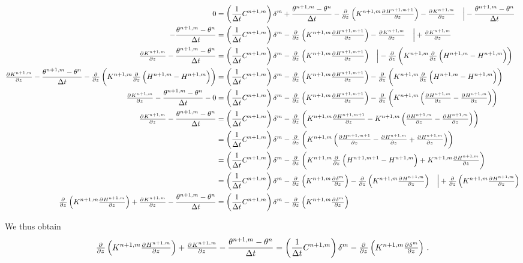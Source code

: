 \begin{landscape}
  \begin{align*}
    0 &= \del{\frac{1}{\Delta t} C^{n+1,m}} \delta^m + \frac{\theta^{n+1,m} - \theta^n}{\Delta t} - \pd{}{z} \del{ K^{n+1,m}\pd{H^{n+1,m+1}}{z} } - \pd{K^{n+1,m}}{z} \quad \Bigr\rvert - \frac{\theta^{n+1,m} - \theta^n}{\Delta t} \\
    - \frac{\theta^{n+1,m} - \theta^n}{\Delta t} &= \del{\frac{1}{\Delta t} C^{n+1,m}} \delta^m - \pd{}{z} \del{ K^{n+1,m}\pd{H^{n+1,m+1}}{z} } - \pd{K^{n+1,m}}{z} \quad \Bigr\rvert + \pd{K^{n+1,m}}{z} \\
    \pd{K^{n+1,m}}{z} - \frac{\theta^{n+1,m} - \theta^n}{\Delta t} &= \del{\frac{1}{\Delta t} C^{n+1,m}} \delta^m - \pd{}{z} \del{ K^{n+1,m}\pd{H^{n+1,m+1}}{z} } \quad \Bigr\rvert - \pd{}{z} \del{ K^{n+1,m}\pd{}{z}\del{ H^{n+1,m} - H^{n+1,m} } } \\
    \pd{K^{n+1,m}}{z} - \frac{\theta^{n+1,m} - \theta^n}{\Delta t} - \pd{}{z} \del{ K^{n+1,m}\pd{}{z}\del{ H^{n+1,m} - H^{n+1,m} } } &= \del{\frac{1}{\Delta t} C^{n+1,m}} \delta^m - \pd{}{z} \del{ K^{n+1,m}\pd{H^{n+1,m+1}}{z} } - \pd{}{z} \del{ K^{n+1,m}\pd{}{z}\del{ H^{n+1,m} - H^{n+1,m} } } \\
    \pd{K^{n+1,m}}{z} - \frac{\theta^{n+1,m} - \theta^n}{\Delta t} - 0 &= \del{ \frac{1}{\Delta t} C^{n+1,m} } \delta^m - \pd{}{z} \del{ K^{n+1,m}\pd{H^{n+1,m+1}}{z} } - \pd{}{z} \del{ K^{n+1,m}\del{ \pd{H^{n+1,m}}{z} - \pd{H^{n+1,m}}{z} } } \\
    \pd{K^{n+1,m}}{z} - \frac{\theta^{n+1,m} - \theta^n}{\Delta t} &= \del{ \frac{1}{\Delta t} C^{n+1,m} } \delta^m - \pd{}{z} \del{ K^{n+1,m}\pd{H^{n+1,m+1}}{z} - K^{n+1,m}\del{ \pd{H^{n+1,m}}{z} - \pd{H^{n+1,m}}{z} } } \\
      &= \del{ \frac{1}{\Delta t} C^{n+1,m} } \delta^m - \pd{}{z} \del{ K^{n+1,m} \del{ \pd{H^{n+1,m+1}}{z} - \pd{H^{n+1,m}}{z} + \pd{H^{n+1,m}}{z} } } \\
      &= \del{ \frac{1}{\Delta t} C^{n+1,m} } \delta^m - \pd{}{z} \del{ K^{n+1,m} \pd{}{z} \del{ H^{n+1,m+1} - H^{n+1,m} } + K^{n+1,m} \pd{H^{n+1,m}}{z} } \\
      &= \del{ \frac{1}{\Delta t} C^{n+1,m} } \delta^m - \pd{}{z} \del{ K^{n+1,m} \pd{\delta^m}{z} } - \pd{}{z} \del{ K^{n+1,m} \pd{H^{n+1,m}}{z} } \quad \Bigr\rvert + \pd{}{z} \del{ K^{n+1,m} \pd{H^{n+1,m}}{z} } \\
    \pd{}{z} \del{ K^{n+1,m} \pd{H^{n+1,m}}{z} } + \pd{K^{n+1,m}}{z} - \frac{\theta^{n+1,m} - \theta^n}{\Delta t} &= \del{ \frac{1}{\Delta t} C^{n+1,m} } \delta^m - \pd{}{z} \del{ K^{n+1,m} \pd{\delta^m}{z} }
  \end{align*}
\end{landscape}
\newpage
We thus obtain
\begin{equation}
  \label{eq:celia_16}
  \pd{}{z} \del{ K^{n+1,m} \pd{H^{n+1,m}}{z} } + \pd{K^{n+1,m}}{z} - \frac{\theta^{n+1,m} - \theta^n}{\Delta t} = \del{ \frac{1}{\Delta t} C^{n+1,m} } \delta^m - \pd{}{z} \del{ K^{n+1,m} \pd{\delta^m}{z} } \, .
\end{equation}

